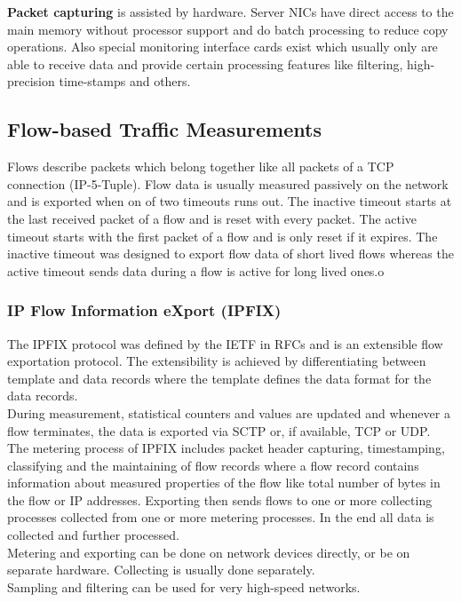 \textbf{Packet capturing} is assisted by hardware.
Server NICs have direct access to the main memory without processor support and do batch processing to reduce copy operations.
Also special monitoring interface cards exist which usually only are able to receive data and provide certain processing features like filtering, high-precision time-stamps and others.

\subsection*{Flow-based Traffic Measurements}
Flows describe packets which belong together like all packets of a TCP connection (IP-5-Tuple).
Flow data is usually measured passively on the network and is exported when on of two timeouts runs out.
The inactive timeout starts at the last received packet of a flow and is reset with every packet.
The active timeout starts with the first packet of a flow and is only reset if it expires.
The inactive timeout was designed to export flow data of short lived flows whereas the active timeout sends data during a flow is active for long lived ones.o

\subsubsection*{IP Flow Information eXport (IPFIX)}
The IPFIX protocol was defined by the IETF in RFCs and is an extensible flow exportation protocol.
The extensibility is achieved by differentiating between template and data records where the template defines the data format for the data records.\\
During measurement, statistical counters and values are updated and whenever a flow terminates, the data is exported via SCTP or, if available, TCP or UDP.\\
The metering process of IPFIX includes packet header capturing, timestamping, classifying and the maintaining of flow records where a flow record contains information about measured properties of the flow like total number of bytes in the flow or IP addresses.
Exporting then sends flows to one or more collecting processes collected from one or more metering processes.
In the end all data is collected and further processed.\\
Metering and exporting can be done on network devices directly, or be on separate hardware.
Collecting is usually done separately.\\
Sampling and filtering can be used for very high-speed networks.

